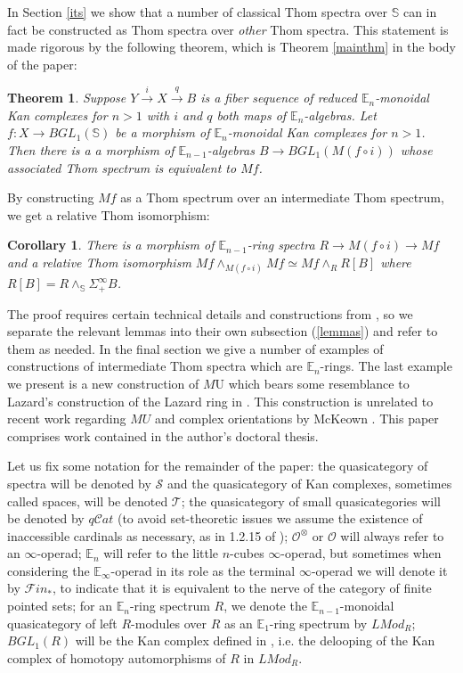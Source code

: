 \documentclass{article}
\theoremstyle{definition}
\theoremstyle{plain}
\newtheorem*{thm*}{Theorem}
\newtheorem*{cor*}{Corollary}
\newcommand{\Cat}{q\mathcal{C}at}
\renewcommand{\S}{\mathcal{S}}
\newcommand{\T}{\mathcal{T}}
\newcommand{\sph}{\mathbb{S}}
\newcommand{\Fin}{\mathcal{F}in_\ast}
\newcommand{\E}{\mathbb{E}}
\newcommand{\MU}{M\mathrm{U}}
\begin{document}
In Section \ref{its} we show that a number of classical Thom spectra over $\sph$ can in fact be constructed as Thom spectra over \emph{other} Thom spectra. This statement is made rigorous by the following theorem, which is Theorem \ref{mainthm} in the body of the paper:  

\begin{thm*}
Suppose $Y\overset{i}\to X\overset{q}\to B$ is a fiber sequence of reduced $\E_n$-monoidal Kan complexes for $n>1$ with $i$ and $q$ both maps of $\E_n$-algebras. Let $f\colon X\to BGL_1(\sph)$ be a morphism of $\E_n$-monoidal Kan complexes for $n>1$. Then there is a a morphism of $\E_{n-1}$-algebras $B\to BGL_1(M(f\circ i))$ whose associated Thom spectrum is equivalent to $Mf$. 
\end{thm*}

By constructing $Mf$ as a Thom spectrum over an intermediate Thom spectrum, we get a relative Thom isomorphism:

\begin{cor*}
There is a morphism of $\E_{n-1}$-ring spectra $R\to M(f\circ i)\to Mf$ and a relative Thom isomorphism $Mf\wedge_{M(f\circ i)} Mf\simeq Mf\wedge_R R[B]$ where $R[B]=R\wedge_\sph\Sigma^\infty_+ B$. 
\end{cor*}

The proof requires certain technical details and constructions from \cite{ha}, so we  separate the relevant lemmas into their own subsection (\ref{lemmas}) and refer to them as needed. In the final section we give a number of examples of constructions of intermediate Thom spectra which are $\E_n$-rings. The last example we present is a new construction of $\MU$ which bears some resemblance to Lazard's construction of the Lazard ring in \cite{laz}. This construction is unrelated to recent work regarding $MU$ and complex orientations by McKeown \cite{mckeown}. This paper comprises work contained in the author's doctoral thesis. 

Let us fix some notation for the remainder of the paper: the quasicategory of spectra will be denoted by $\S$ and the quasicategory of Kan complexes, sometimes called spaces, will be denoted $\T$; the quasicategory of small quasicategories will be denoted by $\Cat$ (to avoid set-theoretic issues we assume the existence of inaccessible cardinals as necessary, as in 1.2.15 of \cite{htt});  $\mathcal{O}^\otimes$ or $\mathcal{O}$ will always refer to an $\infty$-operad; $\E_n$ will refer to the little $n$-cubes $\infty$-operad, but sometimes when considering the $\E_\infty$-operad in its role as the terminal $\infty$-operad we will denote it by $\Fin$, to indicate that it is equivalent to the nerve of the category of finite pointed sets; for an $\E_n$-ring spectrum $R$, we denote the $\E_{n-1}$-monoidal quasicategory of left $R$-modules over $R$ as an $\E_1$-ring spectrum by $LMod_R$; $BGL_1(R)$ will be the Kan complex defined in \cite{abghr}, i.e. the delooping of the Kan complex of homotopy automorphisms of $R$ in $LMod_R$.
 
\end{document}

